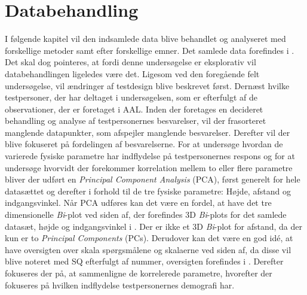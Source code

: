 \chapter{Databehandling}
\label{TestAfSkalaDatabehandling}
%
I følgende kapitel vil den indsamlede data blive behandlet og analyseret med forskellige metoder samt efter forskellige emner. Det samlede data forefindes i . Det skal dog pointeres, at fordi denne undersøgelse er eksplorativ vil databehandlingen ligeledes være det. Ligesom ved den foregående felt undersøgelse, vil ændringer af testdesign blive beskrevet først. Dernæst hvilke testpersoner, der har deltaget i undersøgelsen, som er efterfulgt af de observationer, der er foretaget i AAL. Inden der foretages en decideret behandling og analyse af testpersonernes besvarelser, vil der frasorteret manglende datapunkter, som afspejler manglende besvarelser. Derefter vil der blive fokuseret på fordelingen af besvarelserne. For at undersøge hvordan de varierede fysiske parametre har indflydelse på testpersonernes respons og for at undersøge hvorvidt der forekommer korrelation mellem to eller flere parametre bliver der udført en \textit{Principal Component Analysis} (PCA), først generelt for hele datasættet og derefter i forhold til de tre fysiske parametre: Højde, afstand og indgangsvinkel. Når PCA udføres kan det være en fordel, at have det tre dimensionelle \textit{Bi}-plot ved siden af, der forefindes 3D \textit{Bi}-plots for det samlede datasæt, højde og indgangsvinkel i . Der er ikke et 3D \textit{Bi}-plot for afstand, da der kun er to \textit{Principal Components} (PCs). Derudover kan det være en god idé, at have oversigten over skala spørgsmålene og skalaerne ved siden af, da disse vil blive noteret med SQ efterfulgt af nummer, oversigten forefindes i . Derefter fokuseres der på, at sammenligne de korrelerede parametre, hvorefter der fokuseres på hvilken indflydelse testpersonernes demografi har.        
